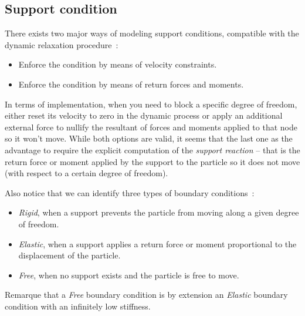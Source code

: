 \subsection{Support condition}
There exists two major ways of modeling support conditions, compatible with the dynamic relaxation procedure~:
\begin{itemize}
\item Enforce the condition by means of velocity constraints.
\item Enforce the condition by means of return forces and moments.
\end{itemize}

In terms of implementation, when you need to block a specific degree of freedom, either reset its velocity to zero in the dynamic process or apply an additional external force to nullify the resultant of forces and moments applied to that node so it won't move. While both options are valid, it seems that the last one as the advantage to require the explicit computation of the \emph{support reaction} -- that is the return force or moment applied by the support to the particle so it does not move (with respect to a certain degree of freedom).

Also notice that we can identify three types of boundary conditions~:
\begin{itemize}
\item \emph{Rigid}, when a support prevents the particle from moving along a given degree of freedom.
\item \emph{Elastic}, when a support applies a return force or moment proportional to the displacement of the particle.
\item \emph{Free}, when no support exists and the particle is free to move.
\end{itemize}
Remarque that a \emph{Free} boundary condition is by extension an \emph{Elastic} boundary condition with an infinitely low stiffness.

